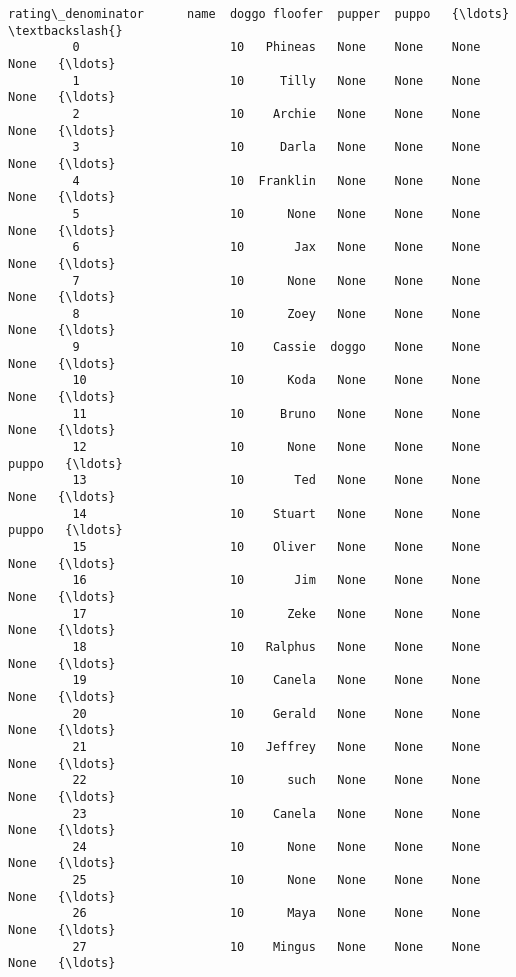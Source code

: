 \documentclass[11pt]{article}
\begin{document}
\begin{Verbatim}[commandchars=\\\{\}]
               rating\_denominator      name  doggo floofer  pupper  puppo   {\ldots}    \textbackslash{}
         0                     10   Phineas   None    None    None   None   {\ldots}     
         1                     10     Tilly   None    None    None   None   {\ldots}     
         2                     10    Archie   None    None    None   None   {\ldots}     
         3                     10     Darla   None    None    None   None   {\ldots}     
         4                     10  Franklin   None    None    None   None   {\ldots}     
         5                     10      None   None    None    None   None   {\ldots}     
         6                     10       Jax   None    None    None   None   {\ldots}     
         7                     10      None   None    None    None   None   {\ldots}     
         8                     10      Zoey   None    None    None   None   {\ldots}     
         9                     10    Cassie  doggo    None    None   None   {\ldots}     
         10                    10      Koda   None    None    None   None   {\ldots}     
         11                    10     Bruno   None    None    None   None   {\ldots}     
         12                    10      None   None    None    None  puppo   {\ldots}     
         13                    10       Ted   None    None    None   None   {\ldots}     
         14                    10    Stuart   None    None    None  puppo   {\ldots}     
         15                    10    Oliver   None    None    None   None   {\ldots}     
         16                    10       Jim   None    None    None   None   {\ldots}     
         17                    10      Zeke   None    None    None   None   {\ldots}     
         18                    10   Ralphus   None    None    None   None   {\ldots}     
         19                    10    Canela   None    None    None   None   {\ldots}     
         20                    10    Gerald   None    None    None   None   {\ldots}     
         21                    10   Jeffrey   None    None    None   None   {\ldots}     
         22                    10      such   None    None    None   None   {\ldots}     
         23                    10    Canela   None    None    None   None   {\ldots}     
         24                    10      None   None    None    None   None   {\ldots}     
         25                    10      None   None    None    None   None   {\ldots}     
         26                    10      Maya   None    None    None   None   {\ldots}     
         27                    10    Mingus   None    None    None   None   {\ldots}     

\end{Verbatim}
\end{document}
